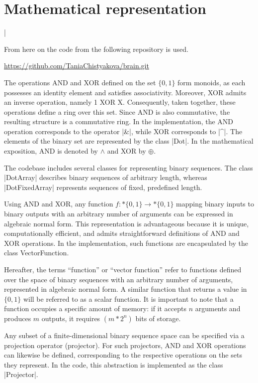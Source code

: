 \documentclass[12pt, a4paper]{article}
\begin{document}
\section{Mathematical representation}

\lstMakeShortInline|

From here on the code from the following repository is used. 

\begin{center}
  \url{https://github.com/TaniaChistyakova/brain.git}
\end{center}


The operations AND and XOR defined on the set $\{0, 1\}$ form monoids, as each possesses 
an identity element and satisfies associativity. Moreover, XOR admits an inverse 
operation, namely 1 XOR X. Consequently, taken together, these operations define a ring 
over this set. Since AND is also commutative, the resulting structure is a commutative 
ring. In the implementation, the AND operation corresponds to the operator |&|, while 
XOR corresponds to |^|. The elements of the binary set are represented by the class |Dot|. 
In the mathematical exposition, AND is denoted by $\land$ and XOR by $\oplus$.

The codebase includes several classes for representing binary sequences. The 
class |DotArray| describes binary sequences of arbitrary length, whereas |DotFixedArray| 
represents sequences of fixed, predefined length.

Using AND and XOR, any function $f:*\{0,1\}\to*\{0,1\}$ mapping binary inputs to binary 
outputs with an arbitrary number of arguments can be expressed in algebraic normal 
form. This representation is advantageous because it is unique, computationally 
efficient, and admits straightforward definitions of AND and XOR operations. In 
the implementation, such functions are encapsulated by the class VectorFunction.

Hereafter, the terms ``function'' or ``vector function'' refer to functions defined 
over the space of binary sequences with an arbitrary number of arguments, 
represented in algebraic normal form. A similar function that returns a value 
in $\{0, 1\}$ will be referred to as a scalar function. It is important to note 
that a function occupies a specific amount of memory: if it accepts $n$ arguments 
and produces $m$ outputs, it requires $(m * 2^n)$ bits of storage.

Any subset of a finite-dimensional binary sequence space can be specified via a 
projection operator (projector). For such projectors, AND and XOR operations can 
likewise be defined, corresponding to the respective operations on the 
sets they represent. In the code, this abstraction is implemented as the class |Projector|.
\end{document}
